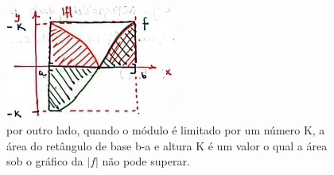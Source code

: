 \documentclass[../analysisII_notes.tex]{subfiles}
\begin{document}
\begin{figure}[H]
	\begin{center}
		\includegraphics[height=0.5\textheight, width=0.5\textwidth, keepaspectratio]{./Images/bound_modulus_08.png}
	\end{center}
	\caption{por outro lado, quando o módulo é limitado por um número K, a área do retângulo de base b-a e altura K é um valor o qual a área sob o gráfico da \(|f|\) não pode superar.}
	\label{bddmod08}
\end{figure}
\end{document}
